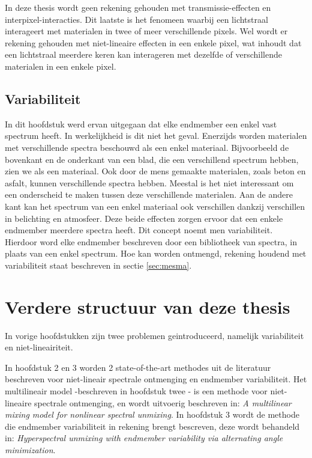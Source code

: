 \documentclass[12pt]{report}
\begin{document}
In deze thesis wordt geen rekening gehouden met transmissie-effecten en interpixel-interacties. Dit laatste is het fenomeen waarbij een lichtstraal interageert met materialen in twee of meer verschillende pixels. Wel wordt er rekening gehouden met niet-lineaire effecten in een enkele pixel, wat inhoudt dat een lichtstraal meerdere keren kan interageren met dezelfde of verschillende materialen in een enkele pixel. 

\section{Variabiliteit}\label{sec:select}

In dit hoofdstuk werd ervan uitgegaan dat elke endmember een enkel vast spectrum heeft. In werkelijkheid is dit niet het geval. Enerzijds worden materialen met verschillende spectra beschouwd als een enkel materiaal. Bijvoorbeeld de bovenkant en de onderkant van een blad, die een verschillend spectrum hebben, zien we als een materiaal. Ook door de mens gemaakte materialen, zoals beton en asfalt, kunnen verschillende spectra hebben. Meestal is het niet interessant om een onderscheid te maken tussen deze verschillende materialen. Aan de andere kant kan het spectrum van een enkel materiaal ook verschillen dankzij verschillen in belichting en atmosfeer. Deze beide effecten zorgen ervoor dat een enkele endmember meerdere spectra heeft. Dit concept noemt men variabiliteit. Hierdoor word elke endmember beschreven door een bibliotheek van spectra, in plaats van een enkel spectrum. Hoe kan worden ontmengd, rekening houdend met variabiliteit staat beschreven in sectie \ref{sec:mesma}. 

\newpage
\chapter*{Verdere structuur van deze thesis}
In vorige hoofdstukken zijn twee problemen geintroduceerd, namelijk variabiliteit en niet-lineairiteit.

In hoofdstuk 2 en 3 worden 2 state-of-the-art methodes uit de literatuur beschreven voor niet-lineair spectrale ontmenging en endmember variabiliteit.  Het multilineair model -beschreven in hoofdstuk twee - is een methode voor niet-lineaire spectrale ontmenging, en wordt uitvoerig beschreven in: \textit{A multilinear mixing model for nonlinear spectral unmixing}\cite{mlinmix}. In hoofdstuk 3 wordt de methode die endmember variabiliteit in rekening brengt bescreven, deze wordt behandeld in: \textit{Hyperspectral unmixing with endmember variability via alternating angle minimization}\cite{mesma}.
\end{document}
